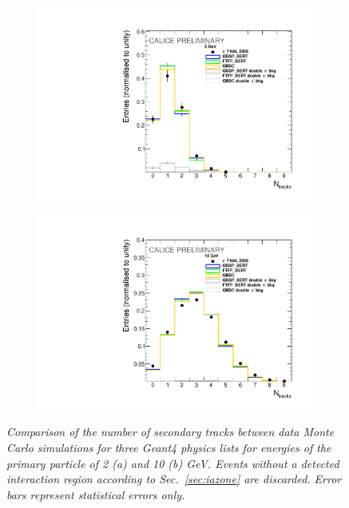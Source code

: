 \begin{figure}
	\centering
	\begin{subfigure}{0.5\textwidth}
		\centering
		\includegraphics[width=.90\linewidth]{ECAL/plots/ntracks-2.pdf}
		\caption{\label{fig:tr2F} }
	\end{subfigure}%
	\begin{subfigure}{0.5\textwidth}
		\centering
		\includegraphics[width=.90\linewidth]{ECAL/plots/ntracks-10.pdf}
		\caption{\label{fig:tr10F} }
	\end{subfigure}
	\caption{\label{fig:trackexampleF} \sl Comparison of the number of secondary tracks between data Monte Carlo simulations for three {\sc Geant}4 physics lists  for energies of the primary particle of 2 (a) and 10 (b) GeV. Events without a detected interaction region according to Sec.~\ref{sec:iazone} are discarded. Error bars represent statistical errors only.}
\end{figure}

